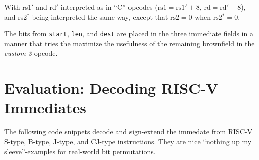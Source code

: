 With rs1$'$ and rd$'$ interpreted as in ``C'' opcodes
($\textrm{rs1} = \textrm{rs1$'$}+8$, $\textrm{rd} = \textrm{rd$'$}+8$),
and rs2$^*$ being interpreted the same way, except that $\textrm{rs2} = 0$
when $\textrm{rs2$^*$} = 0$.

The bits from {\tt start}, {\tt len}, and {\tt dest} are placed in
the three immediate fields in a manner that tries the maximize the usefulness
of the remaining brownfield in the {\it custom-3} opcode.

\section{Evaluation: Decoding RISC-V Immediates}

The following code snippets decode and sign-extend the immedate from RISC-V
S-type, B-type, J-type, and CJ-type instructions. They are nice ``nothing up my
sleeve''-examples for real-world bit permutations.

